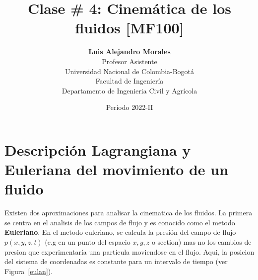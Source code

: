 \documentclass[10pt, oneside]{article}
\title{Clase \# 4: Cinem\'atica de los fluidos [MF100]}
\author{\textbf{Luis Alejandro Morales}\\ \vspace{0.4cm} Profesor Asistente \\ Universidad Nacional de Colombia-Bogot\'a\\Facultad de Ingenier\'ia \\ Departamento de Ingenieria Civil y Agr\'icola}
\date{Periodo 2022-II}
\begin{document}
\maketitle
\tableofcontents

\vspace{.25in}

\section{Descripci\'on Lagrangiana y Euleriana del movimiento de un fluido}
%
%
%
Existen dos aproximaciones para analisar la cinematica de los fluidos. La primera se centra en el analisis de los campos de flujo y es conocido como el metodo \textbf{Euleriano}.  En el metodo euleriano, se calcula la presi\'on del campo de flujo $p(x,y,z,t)$  (e.g en un punto del espacio $x,y,z$ o section) mas no los cambios de presion que experimentar\'ia una part\'icula moviendose en el flujo. Aqui, la posicion del sistema de coordenadas es constante para un intervalo de tiempo (ver Figura~\ref{eulan}).
\end{document}
